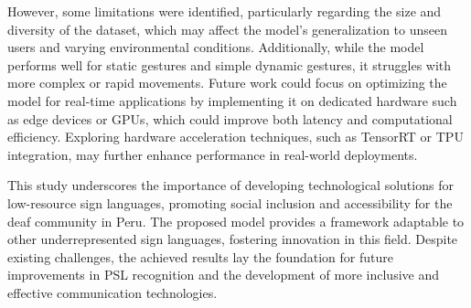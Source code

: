 \documentclass[preprint,12pt,authoryear]{elsarticle}
\begin{document}
However, some limitations were identified, particularly regarding the size and diversity of the dataset, which may affect the model’s generalization to unseen users and varying environmental conditions. Additionally, while the model performs well for static gestures and simple dynamic gestures, it struggles with more complex or rapid movements. Future work could focus on optimizing the model for real-time applications by implementing it on dedicated hardware such as edge devices or GPUs, which could improve both latency and computational efficiency. Exploring hardware acceleration techniques, such as TensorRT or TPU integration, may further enhance performance in real-world deployments.  

This study underscores the importance of developing technological solutions for low-resource sign languages, promoting social inclusion and accessibility for the deaf community in Peru. The proposed model provides a framework adaptable to other underrepresented sign languages, fostering innovation in this field. Despite existing challenges, the achieved results lay the foundation for future improvements in PSL recognition and the development of more inclusive and effective communication technologies.
\end{document}
